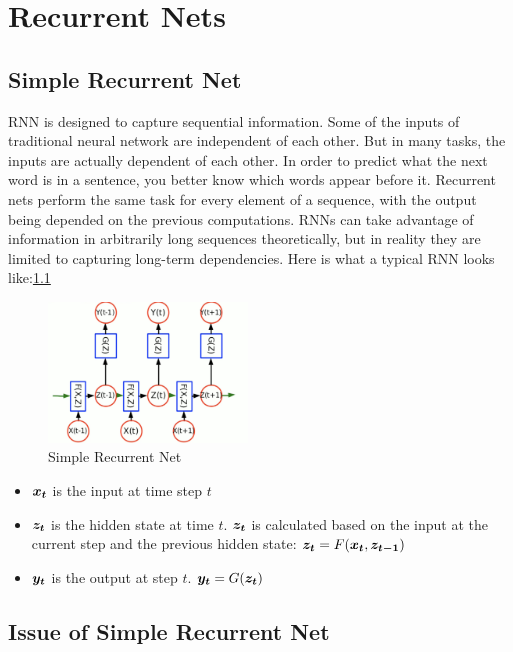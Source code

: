 \chapter{Recurrent Nets}

\section{Simple Recurrent Net}

RNN is designed to capture sequential information.
Some of the inputs of traditional neural network are independent of each other.
But in many tasks, the inputs are actually dependent of each other.
In order to predict what the next word is in a sentence, you better know which words appear before it.
Recurrent nets perform the same task for every element of a sequence, with the output being depended on the previous computations. 
RNNs can take advantage of information in arbitrarily long sequences theoretically, but in reality they are limited to capturing long-term dependencies.
Here is what a typical RNN looks like:\cref{fig:Simple RNN}

\begin{figure}[h]
    \centering
    \includegraphics[width=150pt]{lectures/06-b/image/rnn.png}
    \caption{Simple Recurrent Net}
    \label{fig:Simple RNN}
\end{figure}

\begin{itemize}
  \item $\vect{x_{t}}$ is the input at time step $t$
  \item $\vect{z_{t}}$ is the hidden state at time $t$. $\vect{z_{t}}$ is calculated based on the input at the current step and the previous hidden state:
  $\vect{z_t} = F(\vect{x_t}, \vect{z_{t-1}})$
  \item $\vect{y_t}$ is the output at step $t$. $\vect{y_t} = G(\vect{z_t})$
\end{itemize}



\section{Issue of Simple Recurrent Net}
